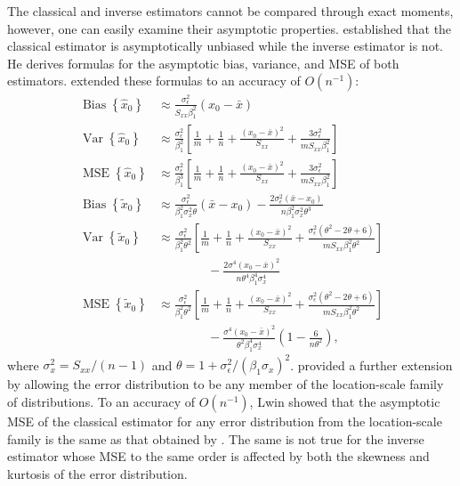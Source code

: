 \documentclass[cmfont,usenames,dvipsnames,leqno]{afit-etd}\usepackage[]{graphicx}\usepackage[]{color}
\newcommand{\newln}{\\&\quad\quad\quad\quad{}}
\newcommand{\wh}[1]{\ensuremath{\widehat{#1}}}
\newcommand{\wt}[1]{\ensuremath{\widetilde{#1}}}
\newcommand{\var}{\operatorname{Var}}
\newcommand{\bias}{\operatorname{Bias}}
\newcommand{\MSE}{\operatorname{MSE}}
\begin{document}
The classical and inverse estimators cannot be compared through exact moments, however, one can easily examine their asymptotic properties. \citet{berkson_estimation_1969} established that the classical estimator is asymptotically unbiased while the inverse estimator is not. He derives formulas for the asymptotic bias, variance, and MSE of both estimators. \citet{shukla_problem_1972} extended these formulas to an accuracy of $O(n^{-1})$:
\begin{align*}
  \bias\left\{\wh{x}_0\right\} &\approx \frac{\sigma_\epsilon^2}{S_{xx}\beta_1^2}(x_0 - \bar{x}) \\
  \var\left\{\wh{x}_0\right\} &\approx \frac{\sigma_\epsilon^2}{\beta_1^2}\left[ \frac{1}{m} + \frac{1}{n} + \frac{(x_0 - \bar{x})^2}{S_{xx}} + \frac{3\sigma_\epsilon^2}{m S_{xx} \beta_1^2} \right] \\
  \MSE\left\{\wh{x}_0\right\} &\approx \frac{\sigma_\epsilon^2}{\beta_1^3}\left[ \frac{1}{m} + \frac{1}{n} + \frac{(x_0 - \bar{x})^2}{S_{xx}} + \frac{3\sigma_\epsilon^2}{m S_{xx} \beta_1^2} \right] \\
  \bias\left\{\wt{x}_0\right\} &\approx \frac{\sigma_\epsilon^2}{\beta_1^2\sigma_x^2\theta}(\bar{x}-x_0) - \frac{2\sigma_\epsilon^2(\bar{x}-x_0)}{n\beta_1^2\sigma_x^2\theta^3} \\
  \var\left\{\wt{x}_0\right\} &\approx \frac{\sigma_\epsilon^2}{\beta_1^2\theta^2}\left[ \frac{1}{m} + \frac{1}{n} + \frac{(x_0 - \bar{x})^2}{S_{xx}} + \frac{\sigma_\epsilon^2(\theta^2-2\theta+6)}{m S_{xx}\beta_1^2\theta^2} \right] \newln - \frac{2\sigma^4(x_0-\bar{x})^2}{n\theta^4\beta_1^4\sigma_x^4} \\
  \MSE\left\{\wt{x}_0\right\} &\approx \frac{\sigma_\epsilon^2}{\beta_1^2\theta^2}\left[ \frac{1}{m} + \frac{1}{n} + \frac{(x_0 - \bar{x})^2}{S_{xx}} + \frac{\sigma_\epsilon^2(\theta^2-2\theta+6)}{m S_{xx}\beta_1^2\theta^2} \right] \newln - \frac{\sigma^4(x_0-\bar{x})^2}{\theta^2\beta_1^4\sigma_x^4}\left(1-\frac{6}{n\theta^2}\right),
\end{align*}
where $\sigma_x^2 = S_{xx}/(n-1)$ and $\theta = 1 + \sigma_\epsilon^2/(\beta_1\sigma_x)^2$. \citet{lwin_discussion_1981} provided a further extension by allowing the error distribution to be any member of the location-scale family of distributions. To an accuracy of $O(n^{-1})$, Lwin showed that the asymptotic MSE of the classical estimator for any error distribution from the location-scale family is the same as that obtained by \citet{shukla_problem_1972}. The same is not true for the inverse estimator whose MSE to the same order is affected by both the skewness and kurtosis of the error distribution.
\end{document}
